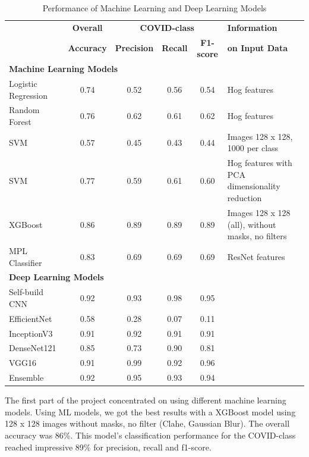 \documentclass{article}
\begin{document}
\begin{table}[h]
    \centering
    \begin{tabular}{|l|c|c|c|c|l|}
        \hline
        \textbf{} & \textbf{Overall} & \multicolumn{3}{c|}{\textbf{COVID-class}} & \textbf{Information} \\
        \textbf{} & \textbf{Accuracy} & \textbf{Precision} & \textbf{Recall} & \textbf{F1-score} & \textbf{on Input Data} \\
        \hline
        \multicolumn{6}{|l|}{\textbf{Machine Learning Models}} \\
        \hline
        Logistic Regression & 0.74 & 0.52 & 0.56 & 0.54 & Hog features \\
        Random Forest & 0.76 & 0.62 & 0.61 & 0.62 & Hog features \\
        SVM & 0.57 & 0.45 & 0.43 & 0.44 & Images 128 x 128, 1000 per class \\
        SVM & 0.77 & 0.59 & 0.61 & 0.60 & Hog features with PCA dimensionality reduction \\
        XGBoost & 0.86 & 0.89 & 0.89 & 0.89 & Images 128 x 128 (all), without masks, no filters \\
        MPL Classifier & 0.83 & 0.69 & 0.69 & 0.69 & ResNet features \\
        \hline
        \multicolumn{6}{|l|}{\textbf{Deep Learning Models}} \\
        \hline
        Self-build CNN & 0.92 & 0.93 & 0.98 & 0.95 &  \\
        EfficientNet & 0.58 & 0.28 & 0.07 & 0.11 &  \\
        InceptionV3 & 0.91 & 0.92 & 0.91 & 0.91 &  \\
        DenseNet121 & 0.85 & 0.73 & 0.90 & 0.81 &  \\
        VGG16 & 0.91 & 0.99 & 0.92 & 0.96 &  \\
        Ensemble & 0.92 & 0.95 & 0.93 & 0.94 &  \\
        \hline
    \end{tabular}
    \caption{Performance of Machine Learning and Deep Learning Models}
    \label{tab:model_performance}
\end{table}

The first part of the project concentrated on using different machine learning models. Using ML models, we got the best results with a XGBoost model using 128 x 128 images without masks, no filter (Clahe, Gaussian Blur). The overall accuracy was 86\%. This model's classification performance for the COVID-class reached impressive 89\% for precision, recall and f1-score. 
\end{document}
